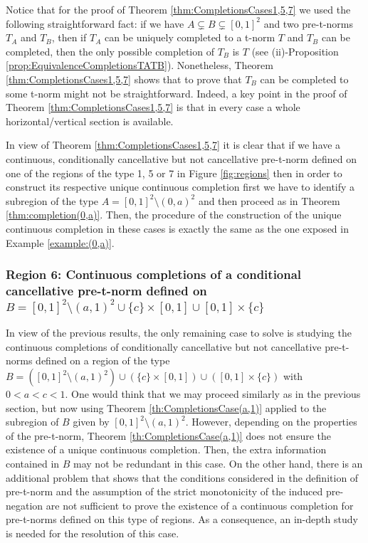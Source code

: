 \begin{remark}
	Notice that for the proof of Theorem \ref{thm:CompletionsCases1,5,7} we used the following straightforward fact: if we have $A \subsetneq B \subsetneq [0,1]^2$ and two pre-t-norms $T_A$ and $T_B$, then if $T_A$ can be uniquely completed to a t-norm $T$ and $T_B$ can be completed, then the only possible completion of $T_B$ is $T$ (see (ii)-Proposition \ref{prop:EquivalenceCompletionsTATB}). Nonetheless, Theorem \ref{thm:CompletionsCases1,5,7} shows that to prove that $T_B$ can be completed to some t-norm might not be straightforward. Indeed, a key point in the proof of Theorem \ref{thm:CompletionsCases1,5,7} is that in every case a whole horizontal/vertical section is available.
\end{remark}

\begin{remark} In view of Theorem \ref{thm:CompletionsCases1,5,7} it is clear that if we have a continuous, conditionally cancellative but not cancellative pre-t-norm defined on one of the regions of the type 1, 5 or 7 in Figure \ref{fig:regions} then in order to construct its respective unique continuous completion first we have to identify a subregion of the type $A=[0,1]^2 \setminus (0,a)^2$ and then proceed as in Theorem \ref{thm:completion(0,a)}. Then, the procedure of the construction of the unique continuous completion in these cases is exactly the same as the one exposed in Example \ref{example:(0,a)}.
\end{remark}

\subsubsection{Region 6: Continuous completions of a conditional cancellative pre-t-norm defined on $B=[0,1]^2 \setminus (a,1)^2 \cup \{c\} \times [0,1] \cup [0,1] \times \{c\}$}

In view of the previous results, the only remaining case to solve is studying the continuous completions of conditionally cancellative but not cancellative pre-t-norms defined on a region of the type $B=([0,1]^2 \setminus (a,1)^2) \cup (\{c\} \times [0,1]) \cup ([0,1] \times \{c\})$ with $0<a<c<1$. One would think that we may proceed similarly as in the previous section, but now using Theorem \ref{th:CompletionsCase(a,1)} applied to the subregion of $B$ given by $[0,1]^2 \setminus (a,1)^2$. However, depending on the properties of the pre-t-norm, Theorem \ref{th:CompletionsCase(a,1)} does not ensure the existence of a unique continuous completion. Then, the extra information contained in $B$ may not be redundant in this case. On the other hand, there is an additional problem that shows that the conditions considered in the definition of pre-t-norm and the assumption of the strict monotonicity of the induced pre-negation are not sufficient to prove the existence of a continuous completion for pre-t-norms defined on this type of regions. As a consequence, an in-depth study is needed for the resolution of this case.



